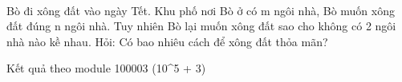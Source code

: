  

Bò đi xông đất vào ngày Tết. Khu phố nơi Bò ở có m ngôi nhà, Bò muốn xông đất đúng n ngôi nhà. Tuy nhiên Bò lại muốn xông đất sao cho không có 2 ngôi nhà nào kề nhau. Hỏi: Có bao nhiêu cách để xông đất thỏa mãn?

Kết quả theo module 100003 (10^5 + 3)